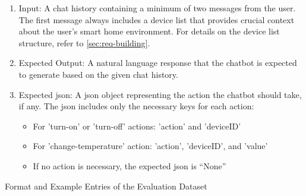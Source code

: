 \begin{enumerate}
    \item Input: A chat history containing a minimum of two messages from the user. The first message always includes a device list that provides crucial context about the user's smart home environment. For details on the device list structure, refer to \cref{sec:req-building}.
    \item Expected Output: A natural language response that the chatbot is expected to generate based on the given chat history.
    \item Expected \gls{json}: A \gls{json} object representing the action the chatbot should take, if any. The \gls{json} includes only the necessary keys for each action:
    \begin{itemize}
    \item For 'turn-on' or 'turn-off' actions: 'action' and 'deviceID'
    \item For 'change-temperature' action: 'action', 'deviceID', and 'value'
    \item If no action is necessary, the expected \gls{json} is ``None''
    \end{itemize}
    \end{enumerate}

\begin{table}[htb]
    \centering
    \caption{Format and Example Entries of the Evaluation Dataset}
    \label{tab:dataset-format}
\end{table}
    
